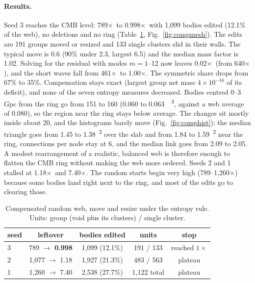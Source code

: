 \documentclass[aps,prd,twocolumn,nofootinbib,superscriptaddress,floatfix]{revtex4-2}
\newcommand{\fl}{\ensuremath{\times}}
\begin{document}
\paragraph*{Results.} Seed 3 reaches the CMB level: 789\fl\ to 0.998\fl\ with 1,099 bodies edited (12.1\% of the web), no deletions and no ring (Table~\ref{tab:compweb}, Fig.~\ref{fig:compmesh}). The edits are 191 groups moved or resized and 133 single clusters slid in their walls. The typical move is \SI{0.6}{\Gpc} (90\% under \SI{2.3}{\Gpc}, largest \SI{6.5}{\Gpc}) and the median mass factor is 1.02. Solving for the residual with modes $m=1$--12 now leaves 0.02\fl\ (from 640\fl), and the short waves fall from 461\fl\ to 1.00\fl. The symmetric share drops from 67\% to 35\%. Compensation stays exact (largest group net mass $4\times10^{-16}$ of its deficit), and none of the seven entropy measures decreased. Bodies centred 0--3\,Gpc from the ring go from 151 to 160 (0.060 to \SI{0.063}{\per\Gpc\cubed}, against a web average of 0.080), so the region near the ring stays below average. The changes sit mostly inside about \SI{20}{\Gpc}, and the histograms barely move (Fig.~\ref{fig:comphist}): the median triangle goes from 1.45 to \SI{1.38}{\Gpc\squared} over the slab and from 1.84 to \SI{1.59}{\Gpc\squared} near the ring, connections per node stay at 6, and the median link goes from 2.09 to \SI{2.05}{\Gpc}. A modest rearrangement of a realistic, balanced web is therefore enough to flatten the CMB ring without making the web more ordered. Seeds 2 and 1 stalled at 1.18\fl\ and 7.40\fl. The random starts begin very high (789--1,260\fl) because some bodies land right next to the ring, and most of the edits go to clearing those.

\begin{table}[tbp]
\caption{Compensated random web, move and resize under the entropy rule. Units: group (void plus its clusters) / single cluster.}
\label{tab:compweb}
\footnotesize
\begin{ruledtabular}
\begin{tabular}{lcccc}
seed & leftover & bodies edited & units & stop\\
\midrule
3 & 789 $\to$ \textbf{0.998} & 1,099 (12.1\%) & 191 / 133 & reached $1\times$\\
2 & 1,077 $\to$ 1.18 & 1,927 (21.3\%) & 483 / 563 & plateau\\
1 & 1,260 $\to$ 7.40 & 2,538 (27.7\%) & 1,122 total & plateau\\
\end{tabular}
\end{ruledtabular}
\end{table}
\end{document}
